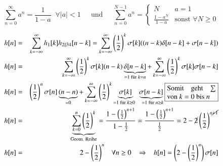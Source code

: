\begin{uebsp}
\begin{Answer}
\begin{enumerate}[i)]
\begin{center}
            \end{center}
            \begin{definition}
                \[\sum_{n=0}^\infty a^n=\frac{1}{1-a}\;\;\forall
                    |a|<1\;\;\;\;\text{ und }\;\;\;\;
                    \sum_{n=0}^{N-1} a^n=\begin{cases}N&a=1\\
                        \frac{1-a^N}{1-a}&\text{sonst }\forall N\geq0\end{cases}\]
            \end{definition}
            \begin{eqnarray*}
                h[n]&=&\sum_{k=-\infty}^\infty h_1[k]h_{2||34}[n-k]=
                \sum_{k=-\infty}^\infty \left(\frac{1}{2}\right)^k\sigma[k]
                ((n-k)\delta[n-k]+\sigma[n-k])\\
                h[n]&=&\sum_{k=-\infty}^\infty \left(\frac{1}{2}\right)^k\sigma[k]
                (n-k)\underbrace{\delta[n-k]}_{=1\text{ für
                }k=n}+\sum_{k=-\infty}^\infty
                \left(\frac{1}{2}\right)^k\sigma[k]\sigma[n-k]\\
                h[n]&=&\left(\frac{1}{2}\right)^n\sigma[n]\underbrace{(n-n)}_{=0}+\sum_{k=-\infty}^\infty
                \left(\frac{1}{2}\right)^k\underbrace{\sigma[k]}_{=1\text{ für
                }k\geq0\;\;}\underbrace{\sigma[n-k]}_{\;\;=1\text{ für }n\geq
            k}\fbox{\begin{minipage}{0.2\linewidth}Somit geht $\sum$ von
            $k=0$ bis $n$\end{minipage}}\\
            h[n]&=&\underbrace{\sum_{k=0}^n\left(\frac{1}{2}\right)^k}_{\text{Geom.
            Reihe}}=\frac{1-\left(\frac{1}{2}\right)^{n+1}}{1-\frac{1}{2}}=
            \frac{1-\left(\frac{1}{2}\right)^{n+1}}{\frac{1}{2}}=
            2-\cancel2\left(\frac{1}{2}\right)^{n\cancel{+1}}\\
            h[n]&=&2-\left(\frac{1}{2}\right)^n\;\;\;\forall
            n\geq0\;\;\;\Rightarrow\;\;\;h[n]=\left(2-\left(\frac{1}{2}\right)^n\right)\sigma[n]
            \end{eqnarray*}
        \end{enumerate}
    \end{Answer}
\end{uebsp}
